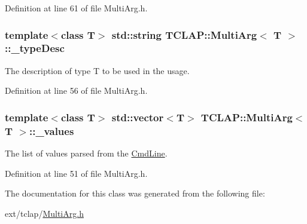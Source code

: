 Definition at line 61 of file Multi\+Arg.\+h.

\hypertarget{class_t_c_l_a_p_1_1_multi_arg_a0f6a2b04fe15d1ede95165fc6e1949e8}{}
\subsubsection[{\+\_\+type\+Desc}]{\setlength{\rightskip}{0pt plus 5cm}template$<$class T$>$ std\+::string {\bf T\+C\+L\+A\+P\+::\+Multi\+Arg}$<$ T $>$\+::\+\_\+type\+Desc\hspace{0.3cm}{\ttfamily [protected]}}\label{class_t_c_l_a_p_1_1_multi_arg_a0f6a2b04fe15d1ede95165fc6e1949e8}
The description of type T to be used in the usage. 

Definition at line 56 of file Multi\+Arg.\+h.

\hypertarget{class_t_c_l_a_p_1_1_multi_arg_aabcab153e09608343713a6ffef431783}{}
\subsubsection[{\+\_\+values}]{\setlength{\rightskip}{0pt plus 5cm}template$<$class T$>$ std\+::vector$<$T$>$ {\bf T\+C\+L\+A\+P\+::\+Multi\+Arg}$<$ T $>$\+::\+\_\+values\hspace{0.3cm}{\ttfamily [protected]}}\label{class_t_c_l_a_p_1_1_multi_arg_aabcab153e09608343713a6ffef431783}
The list of values parsed from the \hyperlink{class_t_c_l_a_p_1_1_cmd_line}{Cmd\+Line}. 

Definition at line 51 of file Multi\+Arg.\+h.



The documentation for this class was generated from the following file\+:\begin{DoxyCompactItemize}
\item 
ext/tclap/\hyperlink{_multi_arg_8h}{Multi\+Arg.\+h}\end{DoxyCompactItemize}
